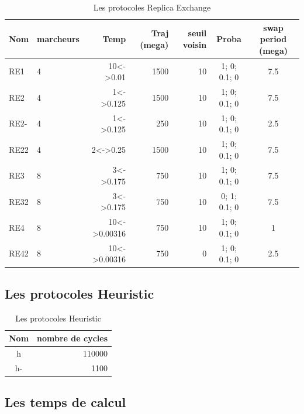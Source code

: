 \documentclass[a4paper,12pt]{article}
\begin{document}
    \begin{table}[!htbp]
      \centering

      \begin{tabular}{|l|l|r|r|r|c|c|}

        \hline
        Nom & marcheurs &Temp & Traj (mega)& seuil voisin  & Proba & swap period (mega)\\
        \hline
        RE1   & 4 & 10<->0.01    &  1500 & 10 & 1; 0; 0.1; 0 &  7.5\\  
        RE2   & 4 & 1<->0.125    &  1500 & 10 & 1; 0; 0.1; 0 &  7.5\\  
        RE2-  & 4 & 1<->0.125    &  250  & 10 & 1; 0; 0.1; 0 &  2.5\\  
        RE22  & 4 & 2<->0.25     &  1500 & 10 & 1; 0; 0.1; 0 &  7.5\\  
        RE3   & 8 & 3<->0.175    &  750  & 10 & 1; 0; 0.1; 0 &  7.5\\
        RE32  & 8 & 3<->0.175    &  750  & 10 & 0; 1; 0.1; 0 &  7.5\\
        RE4   & 8 & 10<->0.00316 &  750  & 10 & 1; 0; 0.1; 0 &  1\\  
        RE42  & 8 & 10<->0.00316 &  750  &  0 & 1; 0; 0.1; 0 &  2.5\\  \hline

      \end{tabular}      
      \caption{Les protocoles Replica Exchange}
      \label{tab_protoRE}      
    \end{table}


   \subsection{Les protocoles Heuristic} 
    
    \begin{table}[!htbp]
      \centering

      \begin{tabular}{|c|r|}

        \hline
        Nom & nombre de cycles \\
        \hline
        h   & 110000 \\  
        h-  & 1100   \\  \hline

      \end{tabular}      
      \caption{Les protocoles Heuristic}
      \label{tab_protoH}      
    \end{table}

    \clearpage
    \subsection{Les temps de calcul} 
    
\end{document}
